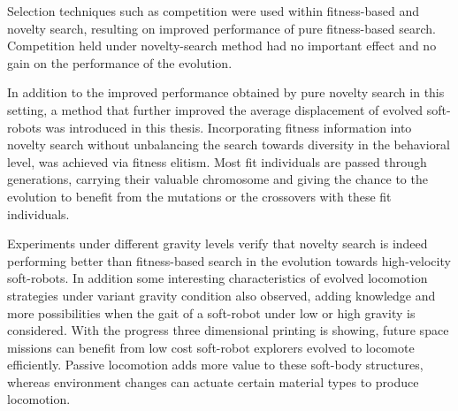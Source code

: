 Selection techniques such as competition were used within fitness-based and novelty search, resulting on improved performance of pure fitness-based search. Competition held under novelty-search method had no important effect and no gain on the performance of the evolution. 

In addition to the improved performance obtained by pure novelty search in this setting, a method that further improved the average displacement of evolved soft-robots was introduced in this thesis. Incorporating fitness information into novelty search without unbalancing the search towards diversity in the behavioral level, was achieved via fitness elitism. Most fit individuals are passed through generations, carrying their valuable chromosome and giving the chance to the evolution to benefit from the mutations or the crossovers with these fit individuals.

Experiments under different gravity levels verify that novelty search is indeed performing better than fitness-based search in the evolution towards high-velocity soft-robots. In addition some interesting characteristics of evolved locomotion strategies under variant gravity condition also observed, adding knowledge and more possibilities when the gait of a soft-robot under low or high gravity is considered. With the progress three dimensional printing is showing, future space missions can benefit from low cost soft-robot explorers evolved to locomote efficiently. Passive locomotion adds more value to these soft-body structures, whereas environment changes can actuate certain material types to produce locomotion.


